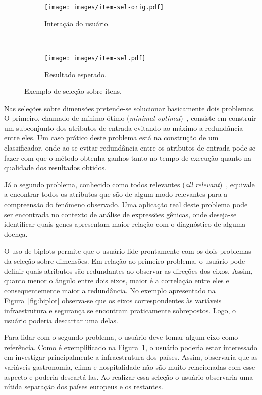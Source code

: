 \begin{figure}[h!]
  \centering
  \begin{subfigure}[b]{0.45\textwidth}
    \centering
    \texttt{[image: images/item-sel-orig.pdf]}
    \caption{Interação do usuário.}
  \end{subfigure}%
  ~
  \begin{subfigure}[b]{0.45\textwidth}
    \centering
    \texttt{[image: images/item-sel.pdf]}
    \caption{Resultado esperado.}
  \end{subfigure} 
  \caption{Exemplo de seleção sobre itens.}
  \label{fig:item-sel}
\end{figure}

Nas seleções sobre dimensões pretende-se solucionar
basicamente dois problemas. O primeiro, chamado de mínimo
ótimo (\emph{minimal optimal})~\cite{Kohavi1997}, consiste
em construir um subconjunto dos atributos de entrada
evitando ao máximo a redundância entre eles. Um caso prático
deste problema está na construção de um classificador, onde
ao se evitar redundância entre os atributos de entrada
pode-se fazer com que o método obtenha ganhos tanto no tempo
de execução quanto na qualidade dos resultados obtidos. 

Já o segundo problema, conhecido como todos relevantes
(\emph{all relevant})~\cite{Nilsson2007}, equivale a
encontrar todos os atributos que são de algum modo
relevantes para a compreensão do fenómeno observado. Uma
aplicação real deste problema pode ser encontrada no
contexto de análise de expressões gênicas, onde deseja-se
identificar quais genes apresentam maior relação com o
diagnóstico de alguma doença. 

O uso de biplots permite que o usuário lide prontamente com
os dois problemas da seleção sobre dimensões. Em relação ao
primeiro problema, o usuário pode definir quais atributos
são redundantes ao observar as direções dos eixos. Assim,
quanto menor o ângulo entre dois eixos, maior é a correlação
entre eles e consequentemente maior a redundância. No
exemplo apresentado na Figura~\ref{fig:biplot} observa-se
que os eixos correspondentes às variáveis infraestrutura e
segurança se encontram praticamente sobrepostos. Logo, o
usuário poderia descartar uma delas. 

Para lidar com o segundo problema, o usuário deve tomar
algum eixo como referência. Como é exemplificado na
Figura~\ref{fig:item-sel}, o usuário poderia estar
interessado em investigar principalmente a infraestrutura
dos países. Assim, observaria que as variáveis gastronomia,
clima e hospitalidade não são muito relacionadas com esse
aspecto e poderia descartá-las. Ao realizar essa seleção o
usuário observaria uma nítida separação dos países europeus
e os restantes.

